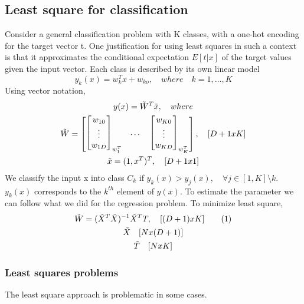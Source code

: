 \documentclass[main.tex]{subfiles}
\newcommand\numberthis{\addtocounter{equation}{1}\tag{\theequation}}
\begin{document}
\subsection{Least square for classification}
Consider a general classification problem with K classes, with a one-hot encoding for the target vector t. One justification for using least squares in such a context is that it approximates the conditional expectation $E[t|x]$ of the target values given the input vector.
Each class is described by its own linear model
\begin{equation}
    y_k(x) = w_k^Tx + w_{ko},\quad where \quad k=1,\dots,K
\end{equation}
Using vector notation,
\begin{gather*}
    y(x) = \Tilde{W}^T \Tilde{x}, \quad where \\
    \Tilde{W}= 
    \begin{bmatrix}
        \begin{bmatrix}
        w_{10} \\ \vdots \\ w_{1D}
        \end{bmatrix}_{w_1^T} 
        & \dots &
        \begin{bmatrix}
        w_{K0} \\ \vdots \\ w_{KD}
        \end{bmatrix}_{w_K^T}
    \end{bmatrix},\quad [D+1 x K] \\
    \Tilde{x}=(1, x^T)^T, \quad [D+1 x 1]
\end{gather*}
We classify the input x into class $C_k$ if $y_k(x)>y_j(x), \quad \forall j \in [1, K] \setminus k$. $y_k(x)$ corresponds to the $k^{th}$ element of $y(x)$.
To estimate the parameter we can follow what we did for the regression problem. To minimize least square,
\begin{gather*}
    \Tilde{W} = (\Tilde{X}^T \Tilde{X})^{-1} \Tilde{X}^T T, \quad [(D+1) x K] \numberthis \\
    \Tilde{X} \quad [N x (D+1)] \\
    \Tilde{T} \quad [N x K]
\end{gather*}
\subsubsection{Least squares problems}
The least square approach is problematic in some cases.
\end{document}
